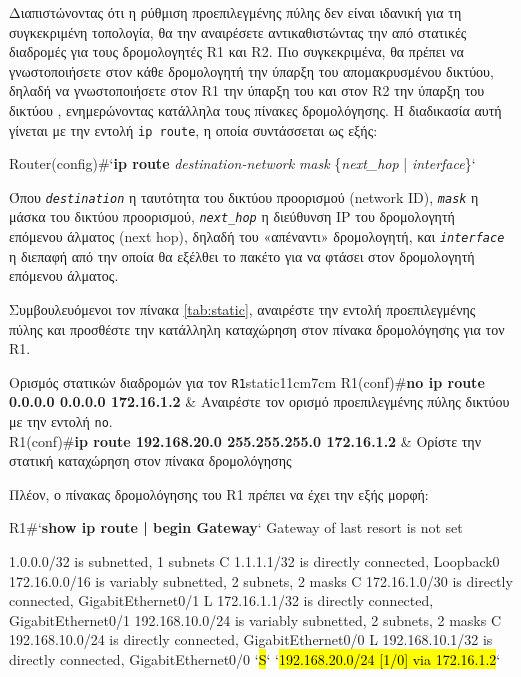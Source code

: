 \documentclass{EdipyLabs} %
\begin{document}
Διαπιστώνοντας ότι η ρύθμιση προεπιλεγμένης πύλης δεν είναι ιδανική για τη συγκεκριμένη τοπολογία, θα την αναιρέσετε αντικαθιστώντας την από στατικές διαδρομές για τους δρομολογητές R1 και R2. Πιο συγκεκριμένα, θα πρέπει να γνωστοποιήσετε στον κάθε δρομολογητή την ύπαρξη του απομακρυσμένου δικτύου, δηλαδή να γνωστοποιήσετε στον R1 την ύπαρξη του  και στον R2 την ύπαρξη του δικτύου , ενημερώνοντας κατάλληλα τους πίνακες δρομολόγησης. Η διαδικασία αυτή γίνεται με την εντολή \texttt{ip route}, η οποία συντάσσεται ως εξής: 

\begin{CommandBox}
Router(config)#`\textbf{ip route} \textit{destination-network} \textit{mask} \{\textit{next\_hop} | \textit{interface}\}`
\end{CommandBox}

Όπου \texttt{\textit{destination}} η ταυτότητα του δικτύου προορισμού (network ID), \texttt{\textit{mask}} η μάσκα του δικτύου προορισμού, \texttt{\textit{next\_hop}} η διεύθυνση IP του δρομολογητή επόμενου άλματος (next hop), δηλαδή του «απέναντι» δρομολογητή, και \texttt{\textit{interface}} η διεπαφή από την οποία θα εξέλθει το πακέτο για να φτάσει στον δρομολογητή επόμενου άλματος.

Συμβουλευόμενοι τον πίνακα \ref{tab:static}, αναιρέστε την εντολή προεπιλεγμένης πύλης και προσθέστε την κατάλληλη καταχώρηση στον πίνακα δρομολόγησης για τον R1.

\begin{CommandTable*}{Ορισμός στατικών διαδρομών για τον \texttt{R1}}{static}{11cm}{7cm}
	R1(conf)\#\textbf{no ip route 0.0.0.0 0.0.0.0 172.16.1.2} & Αναιρέστε τον ορισμό προεπιλεγμένης πύλης δικτύου με την εντολή \texttt{no}.\\[0.125cm]
	R1(conf)\#\textbf{ip route 192.168.20.0 255.255.255.0 172.16.1.2} & Ορίστε την στατική καταχώρηση στον πίνακα δρομολόγησης
\end{CommandTable*}

Πλέον, ο πίνακας δρομολόγησης του R1 πρέπει να έχει την εξής μορφή:

\begin{CommandBox}
R1#`\textbf{show ip route | begin Gateway}`
Gateway of last resort is not set

     1.0.0.0/32 is subnetted, 1 subnets
C       1.1.1.1/32 is directly connected, Loopback0
     172.16.0.0/16 is variably subnetted, 2 subnets, 2 masks
C       172.16.1.0/30 is directly connected, GigabitEthernet0/1
L       172.16.1.1/32 is directly connected, GigabitEthernet0/1
     192.168.10.0/24 is variably subnetted, 2 subnets, 2 masks
C       192.168.10.0/24 is directly connected, GigabitEthernet0/0
L       192.168.10.1/32 is directly connected, GigabitEthernet0/0
`\hl{S}`   `\hl{192.168.20.0/24 [1/0] via 172.16.1.2}`
\end{CommandBox}
\end{document}
